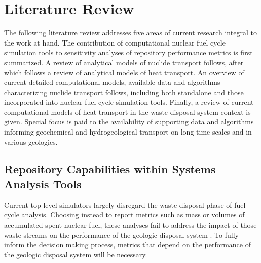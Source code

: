 \chapter{Literature Review}\label{ch:litrev}

The following literature review addresses five areas of current research
integral to the work at hand. The contribution of computational nuclear fuel
cycle simulation tools to sensitivity analyses of repository performance
metrics is first summarized. A review of analytical models of nuclide transport
follows, after which follows a review of analytical models of heat transport.
An overview of current detailed computational models, available data and
algorithms characterizing nuclide transport follows, including both standalone
and those incorporated into nuclear fuel cycle simulation tools. Finally, a
review of current computational models of heat transport in the waste disposal
system context is given.  Special focus is paid to the availability of
supporting data and algorithms informing geochemical and hydrogeological
transport on long time scales and in various geologies. 

\section{Repository Capabilities within Systems Analysis Tools}
\label{sec:SA_repos}



Current top-level simulators largely disregard the waste disposal phase of fuel
cycle analysis. Choosing instead to report metrics such as mass or volumes of
accumulated spent nuclear fuel, these analyses fail to address the impact of
those waste streams on the performance of the geologic disposal system
\cite{wilson_comparing_2011}.  To fully inform the decision making process, 
metrics that depend on the performance of the geologic disposal system will be
necessary. 

